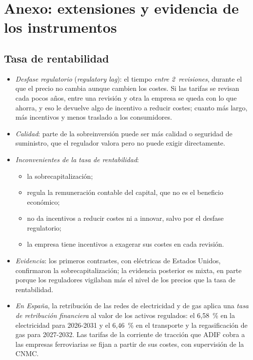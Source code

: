 \documentclass[11pt]{article}
\begin{document}
\section{Anexo: extensiones y evidencia de los instrumentos}\label{anexo:extensiones-instrumentos}

\subsection{Tasa de rentabilidad}\label{anexo:extensiones-aj}

\begin{itemize}
\item \emph{Desfase regulatorio} (\emph{regulatory lag}): el tiempo \emph{entre 2~revisiones}, durante el que el precio no cambia aunque cambien los costes. Si las tarifas se revisan cada pocos años, entre una revisión y otra la empresa se queda con lo que ahorra, y eso le devuelve algo de incentivo a reducir costes; cuanto más largo, más incentivos y menos traslado a los consumidores\nocite{BaumolKlevorick1970Input,Joskow1974Inflation}.
\item \emph{Calidad}: parte de la sobreinversión puede ser más calidad o seguridad de suministro, que el regulador valora pero no puede exigir directamente.
\item \emph{Inconvenientes de la tasa de rentabilidad}:
  \begin{itemize}
  \item la sobrecapitalización;
  \item regula la remuneración contable del capital, que no es el beneficio económico;
  \item no da incentivos a reducir costes ni a innovar, salvo por el desfase regulatorio;
  \item la empresa tiene incentivos a exagerar sus costes en cada revisión.
  \end{itemize}
\item \emph{Evidencia}: los primeros contrastes, con eléctricas de Estados Unidos, confirmaron la sobrecapitalización\nocite{Spann1974Rate,Courville1974Regulation}; la evidencia posterior es mixta, en parte porque los reguladores vigilaban más el nivel de los precios que la tasa de rentabilidad\nocite{Joskow1974Inflation}.
\item \emph{En España}, la retribución de las redes de electricidad y de gas aplica una \emph{tasa de retribución financiera} al valor de los activos regulados\nocite{CNMC2019Circular2}: el 6,58~\% en la electricidad para 2026-2031\nocite{CNMC2025Circular9} y el 6,46~\% en el transporte y la regasificación de gas para 2027-2032\nocite{CNMC2026Circular5}. Las tarifas de la corriente de tracción que ADIF cobra a las empresas ferroviarias se fijan a partir de sus costes, con supervisión de la CNMC\nocite{CNMC2018TarifasAdif}.
\end{itemize}
\end{document}
